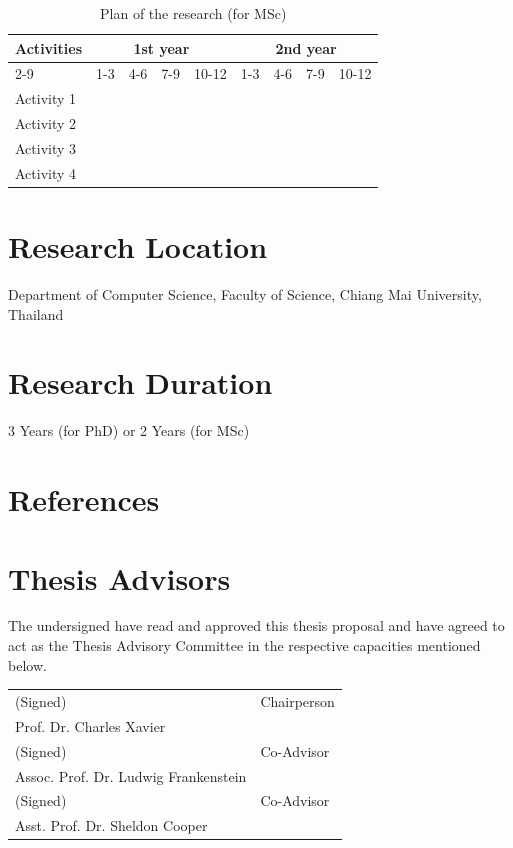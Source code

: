 \documentclass{../class/cscmugradthesis}
\begin{document}
\begin{table}[h!]
\centering
\begin{tabular}{| l | c | c | c | c | c | c | c | c |}
\hline 
\multirow{2}{*}{Activities} & \multicolumn{4}{c|}{1st year} &  \multicolumn{4}{c|}{2nd year} \\ \cline{2-9}
				     & 1-3 & 4-6 & 7-9  & 10-12 & 1-3 & 4-6 & 7-9  & 10-12 \\ \hline
Activity 1 & \cellcolor{blue!25}& \cellcolor{blue!25} & & & & & & \\ \hline
Activity 2 & & &\cellcolor{blue!25} & \cellcolor{blue!25}& & & & \\ \hline
Activity 3 & & & & \cellcolor{blue!25}& \cellcolor{blue!25}& \cellcolor{blue!25}& & \\ \hline
Activity 4 & & & & & & &\cellcolor{blue!25} &\cellcolor{blue!25} \\ 
\hline
\end{tabular}
\caption{Plan of the research (for MSc)}
\end{table}

\newpage

\section{Research Location}
Department of Computer Science, Faculty of Science, Chiang Mai University, Thailand

\section{Research Duration}
3 Years (for PhD) or 2 Years (for MSc)

\section{References}
\printbibliography[heading=none]


\section{Thesis Advisors}
The undersigned have read and approved this thesis proposal and have agreed to act as the Thesis Advisory Committee in the respective capacities mentioned below. 
\\ [\bigskipamount]
\begin{flushright}
\begin{tabular}{@{}p{3.5in}p{1.0in}@{}}
  (Signed) \dotfill & Chairperson \\ 
  Prof. Dr. Charles Xavier & \\ [\bigskipamount]
  (Signed) \dotfill & Co-Advisor \\ 
  Assoc. Prof. Dr. Ludwig Frankenstein & \\ [\bigskipamount]
  (Signed) \dotfill & Co-Advisor \\ 
  Asst. Prof. Dr. Sheldon Cooper  & \\
\end{tabular}
\end{flushright}
\end{document}
